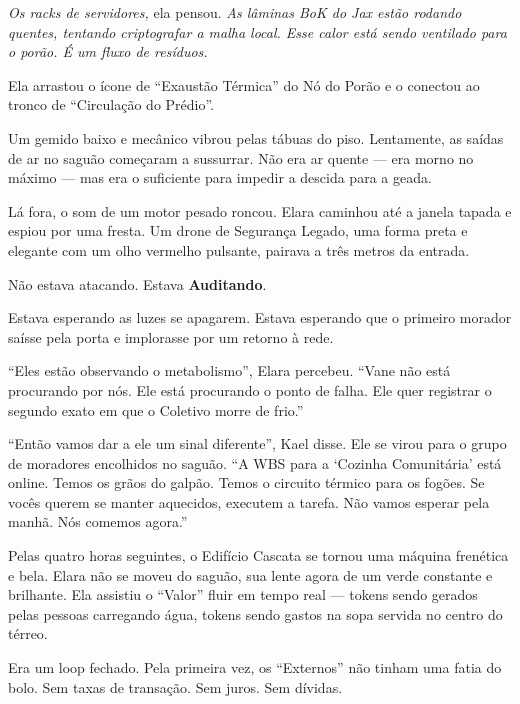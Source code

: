 \textit{Os racks de servidores,} ela pensou. \textit{As lâminas BoK do Jax estão rodando quentes, tentando criptografar a malha local. Esse calor está sendo ventilado para o porão. É um fluxo de resíduos.}

Ela arrastou o ícone de ``Exaustão Térmica'' do Nó do Porão e o conectou ao tronco de ``Circulação do Prédio''.


Um gemido baixo e mecânico vibrou pelas tábuas do piso. Lentamente, as saídas de ar no saguão começaram a sussurrar. Não era ar quente --- era morno no máximo --- mas era o suficiente para impedir a descida para a geada.

Lá fora, o som de um motor pesado roncou. Elara caminhou até a janela tapada e espiou por uma fresta. Um drone de Segurança Legado, uma forma preta e elegante com um olho vermelho pulsante, pairava a três metros da entrada.

Não estava atacando. Estava \textbf{Auditando}.

Estava esperando as luzes se apagarem. Estava esperando que o primeiro morador saísse pela porta e implorasse por um retorno à rede.

``Eles estão observando o metabolismo'', Elara percebeu. ``Vane não está procurando por nós. Ele está procurando o ponto de falha. Ele quer registrar o segundo exato em que o Coletivo morre de frio.''

``Então vamos dar a ele um sinal diferente'', Kael disse. Ele se virou para o grupo de moradores encolhidos no saguão. ``A WBS para a `Cozinha Comunitária' está online. Temos os grãos do galpão. Temos o circuito térmico para os fogões. Se vocês querem se manter aquecidos, executem a tarefa. Não vamos esperar pela manhã. Nós comemos agora.''

Pelas quatro horas seguintes, o Edifício Cascata se tornou uma máquina frenética e bela. Elara não se moveu do saguão, sua lente agora de um verde constante e brilhante. Ela assistiu o ``Valor'' fluir em tempo real --- tokens sendo gerados pelas pessoas carregando água, tokens sendo gastos na sopa servida no centro do térreo.

Era um loop fechado. Pela primeira vez, os ``Externos'' não tinham uma fatia do bolo. Sem taxas de transação. Sem juros. Sem dívidas.

